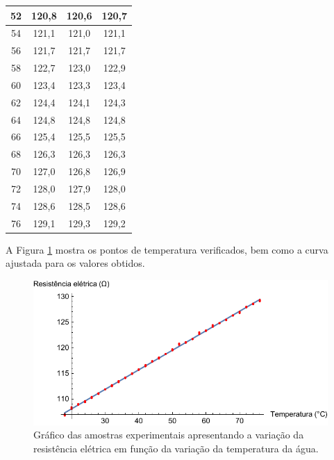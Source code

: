 \documentclass[a4paper]{instrumentacao}
\begin{document}
\begin{table}[H]
\begin{tabular}{|c|c|c|c|}
52                  & 120,8                 & 120,6                 & 120,7          \\ \hline
54                  & 121,1                 & 121,0                 & 121,1          \\ \hline
56                  & 121,7                 & 121,7                 & 121,7          \\ \hline
58                  & 122,7                 & 123,0                 & 122,9          \\ \hline
60                  & 123,4                 & 123,3                 & 123,4          \\ \hline
62                  & 124,4                 & 124,1                 & 124,3          \\ \hline
64                  & 124,8                 & 124,8                 & 124,8          \\ \hline
66                  & 125,4                 & 125,5                 & 125,5          \\ \hline
68                  & 126,3                 & 126,3                 & 126,3          \\ \hline
70                  & 127,0                 & 126,8                 & 126,9          \\ \hline
72                  & 128,0                 & 127,9                 & 128,0          \\ \hline
74                  & 128,6                 & 128,5                 & 128,6          \\ \hline
76                  & 129,1                 & 129,3                 & 129,2          \\ \hline
\end{tabular}
\end{table}

A Figura \ref{fig:pt100-amostras} mostra os pontos de temperatura verificados, bem como a curva ajustada para os valores obtidos.

\begin{figure}[H]
\center
\includegraphics[width=\textwidth]{Pt100-Experimental.pdf}
\caption{Gráfico das amostras experimentais apresentando a variação da resistência elétrica em função da variação da temperatura da água.}
\label{fig:pt100-amostras}
\end{figure}
\end{document}
